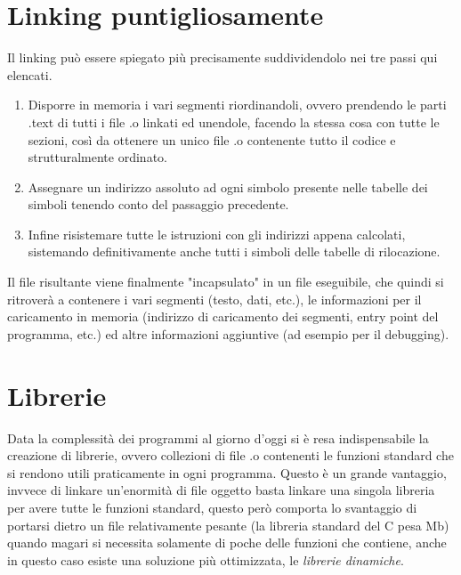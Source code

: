 \documentclass[class=book, crop=false, oneside]{standalone}
\begin{document}
\section{Linking puntigliosamente}

Il linking può essere spiegato più precisamente suddividendolo nei tre passi qui elencati.
\begin{enumerate}
	\item Disporre in memoria i vari segmenti riordinandoli, ovvero prendendo le parti .text di tutti i file .o linkati ed unendole, facendo la stessa cosa con tutte le sezioni, così da ottenere un unico file .o contenente tutto il codice e strutturalmente ordinato.
	\item Assegnare un indirizzo assoluto ad ogni simbolo presente nelle tabelle dei simboli tenendo conto del passaggio precedente.
	\item Infine risistemare tutte le istruzioni con gli indirizzi appena calcolati, sistemando definitivamente anche tutti i simboli delle tabelle di rilocazione.
\end{enumerate}

Il file risultante viene finalmente "incapsulato" in un file eseguibile, che quindi si ritroverà a contenere i vari segmenti (testo, dati, etc.), le informazioni per il caricamento in memoria (indirizzo di caricamento dei segmenti, entry point del programma, etc.) ed altre informazioni aggiuntive (ad esempio per il debugging).

\section{Librerie}

Data la complessità dei programmi al giorno d'oggi si è resa indispensabile la creazione di librerie, ovvero collezioni di file .o contenenti le funzioni standard che si rendono utili praticamente in ogni  programma.
Questo è un grande vantaggio, invvece di linkare un'enormità di file oggetto basta linkare una singola libreria per avere tutte le funzioni standard, questo però comporta lo svantaggio di portarsi dietro un file relativamente pesante (la libreria standard del C pesa \unit[2,5]{Mb}) quando magari si necessita solamente di poche delle funzioni che contiene, anche in questo caso esiste una soluzione più ottimizzata, le \emph{librerie dinamiche}.
\end{document}
